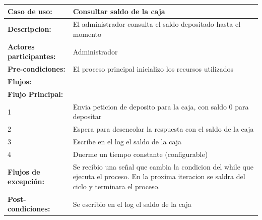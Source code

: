 \documentclass[12pt,a4paper,spanish]{article}
\begin{document}
	\begin{tabular}{|p{4cm}|p{12cm}|}
    \hline
    \textbf{Caso de uso:} & Consultar saldo de la caja \\
    \hline
    \textbf{Descripcion:} &  El administrador consulta el saldo depositado hasta el momento\\
    \hline
    \textbf{Actores participantes:} & Administrador\\
    \hline
 
    \textbf{Pre-condiciones:} &  El proceso principal inicializo los recursos utilizados\\
    \hline
    \hline
    \textbf{Flujos:} &\\
    \hline
	\textbf{Flujo Principal:} &\\ 

	\hline
	1 & Envia peticion de deposito para la caja, con saldo 0 para depositar\\
	\hline
	2 & Espera para desencolar la respuesta con el saldo de la caja\\
	\hline
	3 & Escribe en el log el saldo de la caja\\
	\hline
	4 & Duerme un tiempo constante (configurable)\\
	\hline
	\textbf{Flujos de excepción:} & Se recibio una señal que cambia la condicion del while que ejecuta el proceso. En la proxima iteracion se saldra del ciclo y terminara el proceso.\\
    \hline

    \hline
	\textbf{Post-condiciones:} & Se escribio en el log el saldo de la caja\\
	\hline
	\end{tabular}

	\newpage
\end{document}
